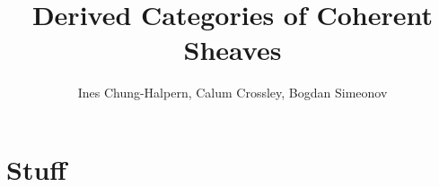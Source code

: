 \documentclass{article}
\title{Derived Categories of Coherent Sheaves}
\author{Ines Chung-Halpern, Calum Crossley, Bogdan Simeonov}
\date{}
\begin{document}
\maketitle

\section{Stuff}
\end{document}
